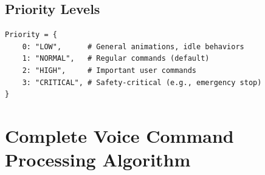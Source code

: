\documentclass{article}
\begin{document}
\subsection{Priority Levels}

\begin{lstlisting}
Priority = {
    0: "LOW",      # General animations, idle behaviors
    1: "NORMAL",   # Regular commands (default)
    2: "HIGH",     # Important user commands
    3: "CRITICAL", # Safety-critical (e.g., emergency stop)
}
\end{lstlisting}

\section{Complete Voice Command Processing Algorithm}
\end{document}

